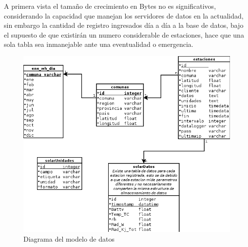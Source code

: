 A primera vista el tamaño de crecimiento en Bytes no es significativos, considerando la capacidad que manejan los servidores de datos en la actualidad, sin embargo la cantidad de registro ingresados día a día a la base de datos, bajo el supuesto de que existirán un numero considerable de estaciones, hace que una sola tabla sea inmanejable ante una eventualidad o emergencia.

\begin{figure}[h!]
        \centering
        \includegraphics[scale=0.6]{images/modeloDatos}
        \caption{Diagrama del modelo de datos}
        \label{modeloDatos}
\end{figure}


